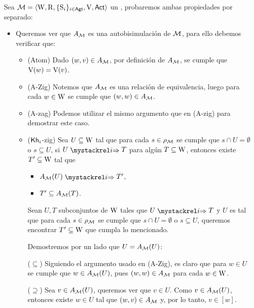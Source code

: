 \begin{demostracion}
    Sea $\mathcal{M}=\langle \mathrm{W},\mathrm{R},\{ \mathrm{S}_i \}_{i \in {\rm \sf Agt}},\mathrm{V},{\rm \sf Act} \rangle$ un \ults, probaremos ambas propiedades por separado:

    \begin{itemize}
        \item Queremos ver que $A_{\mathcal{M}}$ es una autobisimulación de $\mathcal{M}$, para ello debemos verificar que:
        \begin{itemize}
            \item (Atom) Dado $(w,v) \in A_{\mathcal{M}}$, por definición de $A_{\mathcal{M}}$, se cumple que $\mathrm{V}(w) = \mathrm{V}(v)$.
            \item (A-Zig) Notemos que $A_{\mathcal{M}}$ es una relación de equivalencia, luego para cada $w\in \mathrm{W}$ se cumple que $(w,w) \in A_{\mathcal{M}}$.
            \item (A-zag) Podemos utilizar el mismo argumento que en (A-zig) para demostrar este caso.
            \item ($\mathsf{Kh}_i$-zig) Sea $U \subseteq \mathrm{W}$ tal que para cada $s \in \rho_{\mathcal{M}}$ se cumple que $s \cap U = \emptyset$ o 
            $s \subseteq U$, si $U \ultsExecAgi T$ para algún $T \subseteq \mathrm{W}$, entonces existe $T' \subseteq \mathrm{W}$ tal que
                \begin{multicols}{2}
                    \begin{itemize}
                        \item $A_\model(U) \ultsExecAgi T'$, 
                        \item $T' \subseteq A_{\mathcal{M}}(T)$.
                    \end{itemize}
                \end{multicols}

            Sean $U,T$ subconjuntos de $\mathrm{W}$ tales que $U \ultsExecAgi T$ y $U$ es tal que para cada $s \in \rho_{\mathcal{M}}$ se cumple que 
            $s \cap U = \emptyset$ o $s \subseteq U$, queremos encontrar $T' \subseteq \mathrm{W}$ que cumpla lo mencionado.
            
            Demostremos por un lado que $U = A_{\mathcal{M}}(U)$:
            
            ($\subseteq$) Siguiendo el argumento usado en (A-Zig), es claro que para $w \in U$ se cumple que $w \in A_{\mathcal{M}}(U)$, 
            pues $(w,w) \in A_{\mathcal{M}}$ para cada $w \in \mathrm{W}$. 
            
            ($\supseteq$) Sea $v \in A_{\mathcal{M}}(U)$, queremos ver que $v \in U$.
            Como $v \in A_{\mathcal{M}}(U)$, entonces existe $w \in U$ tal que $(w,v) \in A_{\mathcal{M}}$ y, por lo tanto, $v \in [w]$.
            

\end{itemize}
\end{itemize}
\end{demostracion}
